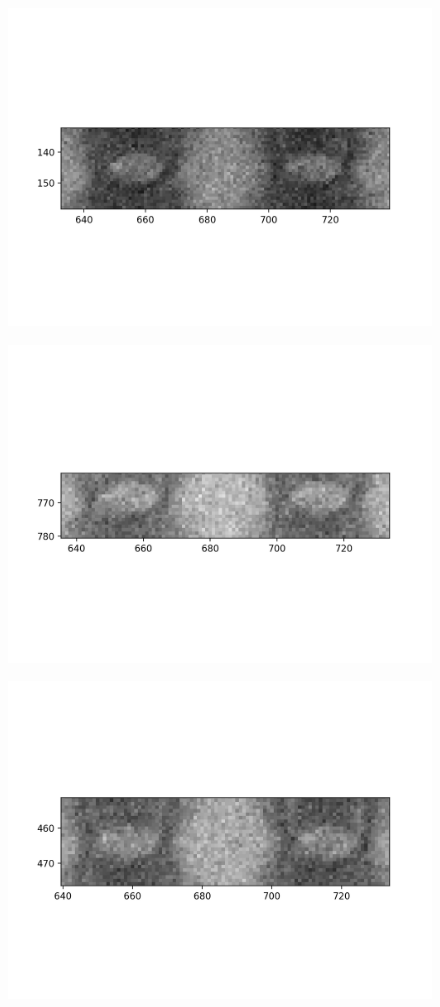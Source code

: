 \documentclass[10pt,a4paper]{article}
\begin{document}
	\begin{figure}[h]
		\includegraphics{data/image_stamps/f6}
	\end{figure}
	\begin{figure}[h]
		\includegraphics{data/image_stamps/f7}
	\end{figure}
	\begin{figure}[h]
		\includegraphics{data/image_stamps/f8}
	\end{figure}
\end{document}
